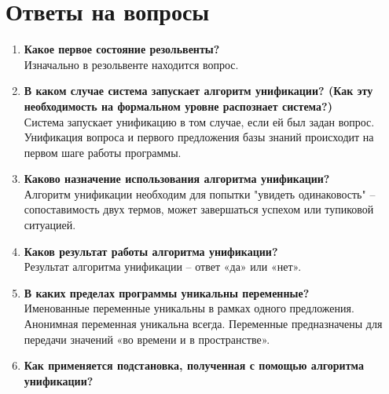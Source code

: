 \newpage
\section*{Ответы на вопросы}
\begin{enumerate}
	    
	\item \textbf{Какое первое состояние резольвенты?}\\
	Изначально в резольвенте находится вопрос.
	
    \item \textbf{В каком случае система запускает алгоритм унификации? (Как эту необходимость на формальном уровне распознает система?)}\\ 
    Система запускает унификацию в том случае, если ей был задан вопрос. Унификация вопроса и первого предложения базы знаний происходит на первом шаге работы программы. 
    
    \item \textbf{Каково назначение использования алгоритма унификации? }\\
    Алгоритм унификации необходим для попытки "увидеть одинаковость" – сопоставимость двух термов, может завершаться успехом или тупиковой ситуацией. 
    
    \item \textbf{Каков  результат работы алгоритма унификации?  }\\
    Результат алгоритма унификации – ответ «да» или «нет». 

    \item \textbf{В каких пределах программы уникальны переменные? }\\
	Именованные переменные уникальны в рамках одного предложения. Анонимная переменная уникальна всегда. Переменные предназначены для передачи значений «во времени и в пространстве». 
	
	\item \textbf{\textbf{Как применяется подстановка, полученная с помощью алгоритма унификации?}}\\
	

\end{enumerate}
